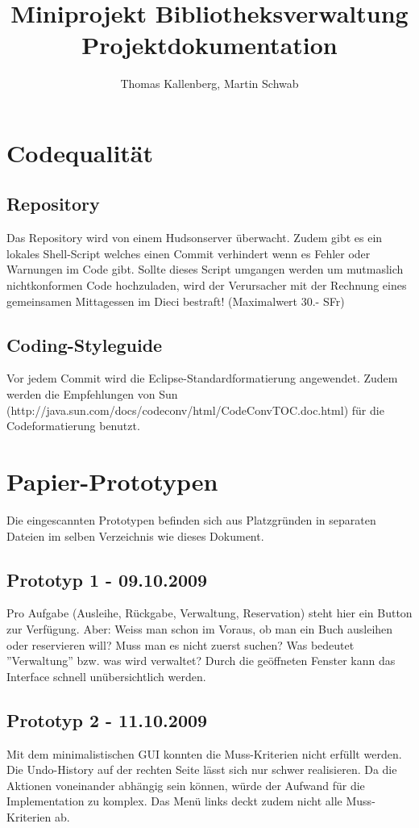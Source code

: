 \documentclass[10pt, a4paper]{scrartcl}
\title{Miniprojekt Bibliotheksverwaltung \\ \normalsize{Projektdokumentation}}
\author{Thomas Kallenberg, Martin Schwab}
\begin{document}
\maketitle
\section{Codequalität}
\subsection{Repository}
Das Repository wird von einem Hudsonserver überwacht. Zudem gibt es ein lokales Shell-Script welches einen Commit verhindert wenn es Fehler oder Warnungen im Code gibt. Sollte dieses Script umgangen werden um mutmaslich nichtkonformen Code hochzuladen, wird der Verursacher mit der Rechnung eines gemeinsamen Mittagessen im Dieci bestraft! (Maximalwert 30.- SFr)

\subsection{Coding-Styleguide}
Vor jedem Commit wird die Eclipse-Standardformatierung angewendet. Zudem werden die Empfehlungen von Sun (http://java.sun.com/docs/codeconv/html/CodeConvTOC.doc.html) für die Codeformatierung benutzt.

\section{Papier-Prototypen}
Die eingescannten Prototypen befinden sich aus Platzgründen in separaten Dateien im selben Verzeichnis wie dieses Dokument.

\subsection{Prototyp 1 - 09.10.2009}
Pro Aufgabe (Ausleihe, Rückgabe, Verwaltung, Reservation) steht hier ein Button zur Verfügung. Aber: Weiss man schon im Voraus, ob man ein Buch ausleihen oder reservieren will? Muss man es nicht zuerst suchen? Was bedeutet ''Verwaltung'' bzw. was wird verwaltet? Durch die geöffneten Fenster kann das Interface schnell unübersichtlich werden.

\subsection{Prototyp 2 - 11.10.2009}
Mit dem minimalistischen GUI konnten die Muss-Kriterien nicht erfüllt werden. Die Undo-History auf der rechten Seite lässt sich nur schwer realisieren. Da die Aktionen voneinander abhängig sein können, würde der Aufwand für die Implementation zu komplex. Das Menü links deckt zudem nicht alle Muss-Kriterien ab.
\end{document}
